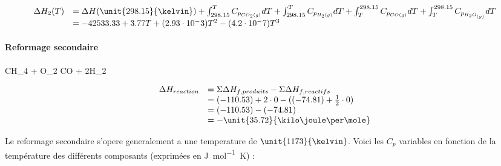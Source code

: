 \documentclass{article}
\begin{document}
$$
	\begin{array}{rl}
		  \Delta H_2(T)	&=   \Delta H(\unit{298.15}{\kelvin}) 
											 + \int_{298.15}^{T} C_{p_{CO_2(g)}} dT + \int_{298.15}^{T} C_{p_{H_2(g)}} dT 
											 +  \int_{T}^{298.15} C_{p_{CO(g)}} dT + \int_{T}^{298.15}C_{p_{H_{2}O_{(g)}}}dT \\
										&=  -42533.33+3.77T+(2.93\cdot 10^-3)T^2-(4.2\cdot 10^-7)T^3
	\end{array}
$$	

%

\paragraph{Reformage secondaire}

\begin{chemmath}
		CH_4 + O_2 \Longrightarrow CO + 2H_2
\end{chemmath}

$$
	\begin{array}{rl}
	\Delta H_{reaction}		&= \Sigma \Delta H_{f,produits} - \Sigma \Delta H_{f,reactifs}\\
												&= (-110.53) + 2\cdot 0 - ((-74.81) + \frac{1}{2}\cdot 0)\\
												&=  (-110.53) - (-74.81)\\
												&=  -\unit{35.72}{\kilo\joule\per\mole}
	\end{array}
$$

Le reformage secondaire s'opere generalement a une temperature de $\unit{1173}{\kelvin}$.
Voici les $C_p$ variables en fonction de la température des différents composants\cite{hc-table} 
(exprimées en \unit{\joule\per\mole\kelvin}) :
\end{document}
